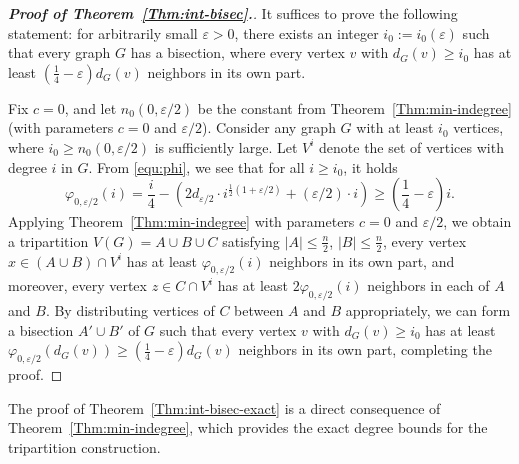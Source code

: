 \documentclass{aic}
\begin{document}
	\begin{proof}[\bf Proof of Theorem~\ref{Thm:int-bisec}.]
		It suffices to prove the following statement: for arbitrarily small $\varepsilon>0$,
		there exists an integer $i_0:=i_0(\varepsilon)$ such that every graph $G$ has a bisection, where every vertex $v$ with $d_G(v)\geq i_0$ has at least $\left(\frac{1}{4}-\varepsilon\right)d_G(v)$ neighbors in its own part.
		
		Fix $c=0$, and let $n_0(0,\varepsilon/2)$ be the constant from Theorem~\ref{Thm:min-indegree} (with parameters $c=0$ and $\varepsilon/2$).
		Consider any graph $G$ with at least $i_0$ vertices, where $i_0\geq n_0(0,\varepsilon/2)$ is sufficiently large.
		Let $V^i$ denote the set of vertices with degree $i$ in $G$.
		From \eqref{equ:phi}, we see that for all $i\geq i_0$, it holds
		$$\varphi_{0,\varepsilon/2}(i)=\frac{i}{4}-\left(2d_{\varepsilon/2}\cdot i^{\frac{1}{2}(1+\varepsilon/2)}+(\varepsilon/2)\cdot i\right)\geq \left(\frac{1}{4}-\varepsilon\right)i.$$
		Applying Theorem~\ref{Thm:min-indegree} with parameters $c=0$ and $\varepsilon/2$, we obtain a tripartition $V(G) = A \cup B \cup C$ satisfying $|A|\leq \frac{n}{2}$, $|B| \leq \frac{n}{2}$,
		every vertex $x\in (A\cup B)\cap V^i$ has at least $\varphi_{0,\varepsilon/2}(i)$ neighbors in its own part,
		and moreover, every vertex $z\in C\cap V^i$ has at least $2\varphi_{0,\varepsilon/2}(i)$ neighbors in each of $A$ and $B$.
		By distributing vertices of $C$ between $A$ and $B$ appropriately, we can form a bisection $A'\cup B'$ of $G$
		such that every vertex $v$ with $d_G(v)\geq i_0$ has at least $\varphi_{0,\varepsilon/2}(d_G(v))\geq \left(\frac{1}{4}-\varepsilon\right)d_G(v)$ neighbors in its own part,
		completing the proof.
	\end{proof}
	
	The proof of Theorem~\ref{Thm:int-bisec-exact} is a direct consequence of Theorem~\ref{Thm:min-indegree},
	which provides the exact degree bounds for the tripartition construction.
	
\end{document}
